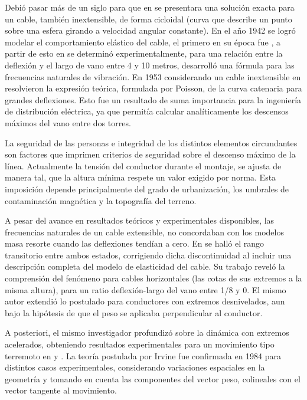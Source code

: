 Debió pasar más de un siglo para que en \cite{routh1955dynamics} se presentara una solución exacta para un cable, también inextensible, de forma cicloidal (curva que describe un punto sobre una esfera girando a velocidad angular constante). En el año 1942 se logró modelar el comportamiento elástico del cable, el primero en su época fue \citep{Kloppel1942}, a partir de esto en \cite{Pugsley1949} se determinó experimentalmente, para una relación entre la deflexión y el largo de vano entre 4 y 10 metros, desarrolló una fórmula para las frecuencias naturales de vibración. En 1953 considerando un cable inextensible en \cite{Saxon1953} resolvieron la expresión teórica, formulada por Poisson, de la curva catenaria para grandes deflexiones. Esto fue un resultado de suma importancia para la ingeniería de distribución eléctrica, ya que permitía calcular analíticamente los descensos máximos del vano entre dos torres.

La seguridad de las personas e integridad de los distintos elementos circundantes son factores que imprimen criterios de seguridad sobre el descenso máximo de la línea. Actualmente la tensión del conductor durante el montaje, se ajusta de manera tal, que la altura mínima respete un valor exigido por norma. Esta imposición depende principalmente del grado de urbanización, los umbrales de contaminación magnética y la topografía del terreno.   

A pesar del avance en resultados teóricos y experimentales disponibles, las frecuencias naturales de un cable extensible, no concordaban con los modelos masa resorte cuando las deflexiones tendían a cero. En \cite{Irvine1974} se halló el rango transitorio entre ambos estados, corrigiendo dicha discontinuidad al incluir una descripción completa del modelo de elasticidad del cable. Su trabajo reveló la comprensión del fenómeno para cables horizontales (las cotas de sus extremos a la misma altura), para un ratio deflexión-largo del vano entre 1/8 y 0. El mismo autor \cite{Irvine1974} extendió lo postulado para conductores con extremos desnivelados, aun bajo la hipótesis de que el peso se aplicaba perpendicular al conductor.

A posteriori, el mismo investigador profundizó sobre la dinámica con extremos acelerados, obteniendo resultados experimentales para un movimiento tipo terremoto en \citep{Irvine1976} y \citep{Irvine1978}. La teoría postulada por Irvine fue confirmada en \cite{Triantafyllou1984} 1984 para distintos casos experimentales,  considerando variaciones espaciales en la geometría y tomando en cuenta las componentes del vector peso, colineales con el vector tangente al movimiento.

